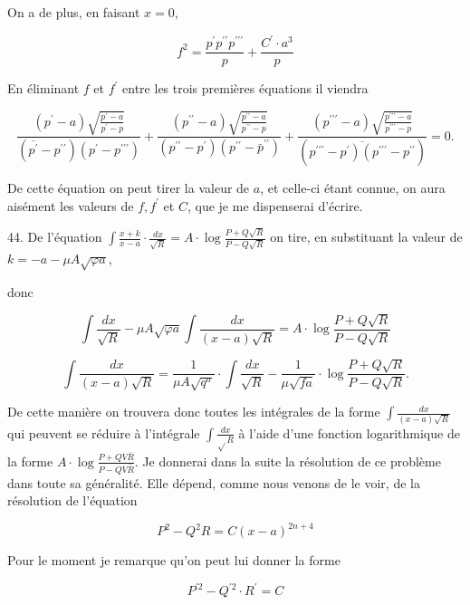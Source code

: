 \documentclass{article}
\begin{document}
On a de plus, en faisant \(x=0\),

\[
f^{2}=\frac{p^{\prime} p^{\prime \prime} p^{\prime \prime \prime}}{p}+\frac{C^{\prime} \cdot a^{3}}{p}
\]

En éliminant \(f\) et \(f^{\prime}\) entre les trois premières équations il viendra

\[
\frac{\left(p^{\prime}-a\right) \sqrt{\frac{p^{\prime}-a}{p^{\prime}-p}}}{\left(\overline{p^{\prime}}-p^{\prime \prime}\right)\left(p^{\prime}-p^{\prime \prime \prime}\right)}+\frac{\left(p^{\prime \prime}-a\right) \sqrt{\frac{p^{\prime \prime}-a}{p^{\prime \prime}-p}}}{\left(p^{\prime \prime}-p^{\prime}\right)\left(p^{\prime \prime}-\bar{p}^{\prime \prime}\right)}+\frac{\left(p^{\prime \prime \prime}-a\right) \sqrt{\frac{p^{\prime \prime \prime}-a}{p^{\prime \prime \prime}-p}}}{\left(\overline{\left.p^{\prime \prime \prime}-p^{\prime}\right)\left(p^{\prime \prime \prime}-p^{\prime \prime}\right.}\right)}=0 .
\]

De cette équation on peut tirer la valeur de \(a\), et celle-ci étant connue, on aura aisément les valeurs de \(f, f^{\prime}\) et \(C\), que je me dispenserai d'écrire.

44. De l'équation \(\int \frac{x+k}{x-a} \cdot \frac{d x}{\sqrt{R}}=A \cdot \log \frac{P+Q \sqrt{R}}{P-Q \sqrt{R}}\) on tire, en substituant la valeur de \(k=-a-\mu A \sqrt{\varphi a}\),

donc

\[
\int \frac{d x}{\sqrt{R}}-\mu A \sqrt{\varphi a} \int \frac{d x}{(x-a) \sqrt{R}}=A \cdot \log \frac{P+Q \sqrt{R}}{P-Q \sqrt{R}}
\]

\[
\int \frac{d x}{(x-a) \sqrt{R}}=\frac{1}{\mu A \sqrt{q^{a}}} \cdot \int \frac{d x}{\sqrt{R}}-\frac{1}{\mu \sqrt{f a}} \cdot \log \frac{P+Q \sqrt{R}}{P-Q \sqrt{R}} .
\]

De cette manière on trouvera donc toutes les intégrales de la forme \(\int \frac{d x}{(x-a) \sqrt{R}}\) qui peuvent se réduire à l'intégrale \(\int \frac{d x}{\sqrt{ } R}\) à l'aide d'une fonction logarithmique de la forme \(A \cdot \log \frac{P+Q V \bar{R}}{P-Q V \bar{R}}\). Je donnerai dans la suite la résolution de ce problème dans toute sa généralité. Elle dépend, comme nous venons de le voir, de la résolution de l'équation

\[
P^{2}-Q^{2} R=C(x-a)^{2 n+4}
\]

Pour le moment je remarque qu'on peut lui donner la forme

\[
P^{\prime 2}-Q^{\prime 2} \cdot R^{\prime}=C
\]
\end{document}
